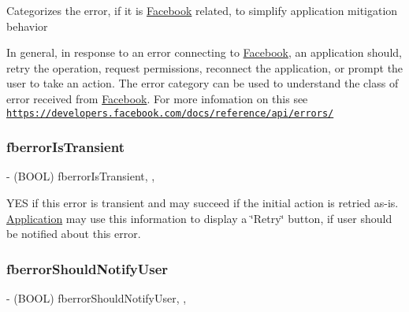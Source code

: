 Categorizes the error, if it is \hyperlink{interfaceFacebook}{Facebook} related, to simplify application mitigation behavior

In general, in response to an error connecting to \hyperlink{interfaceFacebook}{Facebook}, an application should, retry the operation, request permissions, reconnect the application, or prompt the user to take an action. The error category can be used to understand the class of error received from \hyperlink{interfaceFacebook}{Facebook}. For more infomation on this see \href{https://developers.facebook.com/docs/reference/api/errors/}{\tt https\+://developers.\+facebook.\+com/docs/reference/api/errors/} \mbox{\label{categoryNSError_07FBError_08_a86c97474af8d8a44eae81bbf654525d4}} 
\subsubsection{\texorpdfstring{fberror\+Is\+Transient}{fberrorIsTransient}}
{\footnotesize\ttfamily -\/ (B\+O\+OL) fberror\+Is\+Transient\hspace{0.3cm}{\ttfamily [read]}, {\ttfamily [atomic]}, {\ttfamily [assign]}}

Y\+ES if this error is transient and may succeed if the initial action is retried as-\/is. \hyperlink{classApplication}{Application} may use this information to display a \char`\"{}\+Retry\char`\"{} button, if user should be notified about this error. \mbox{\label{categoryNSError_07FBError_08_aa6c42b44d37936d83861e190cee733b5}} 
\subsubsection{\texorpdfstring{fberror\+Should\+Notify\+User}{fberrorShouldNotifyUser}}
{\footnotesize\ttfamily -\/ (B\+O\+OL) fberror\+Should\+Notify\+User\hspace{0.3cm}{\ttfamily [read]}, {\ttfamily [atomic]}, {\ttfamily [assign]}}

